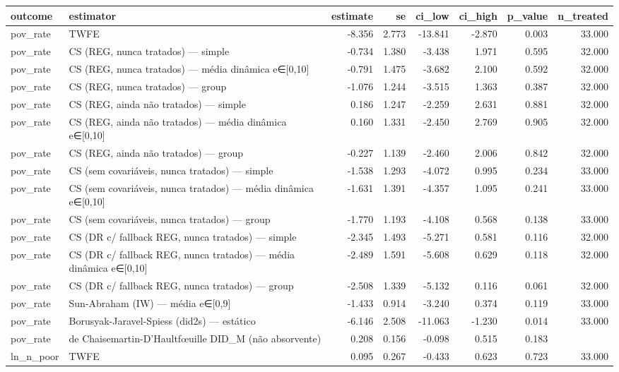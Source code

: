 \begin{tabular}{llrrrrrr}
\toprule
outcome & estimator & estimate & se & ci_low & ci_high & p_value & n_treated \\
\midrule
pov_rate & TWFE & -8.356 & 2.773 & -13.841 & -2.870 & 0.003 & 33.000 \\
pov_rate & CS (REG, nunca tratados) — simple & -0.734 & 1.380 & -3.438 & 1.971 & 0.595 & 32.000 \\
pov_rate & CS (REG, nunca tratados) — média dinâmica e∈[0,10] & -0.791 & 1.475 & -3.682 & 2.100 & 0.592 & 32.000 \\
pov_rate & CS (REG, nunca tratados) — group & -1.076 & 1.244 & -3.515 & 1.363 & 0.387 & 32.000 \\
pov_rate & CS (REG, ainda não tratados) — simple & 0.186 & 1.247 & -2.259 & 2.631 & 0.881 & 32.000 \\
pov_rate & CS (REG, ainda não tratados) — média dinâmica e∈[0,10] & 0.160 & 1.331 & -2.450 & 2.769 & 0.905 & 32.000 \\
pov_rate & CS (REG, ainda não tratados) — group & -0.227 & 1.139 & -2.460 & 2.006 & 0.842 & 32.000 \\
pov_rate & CS (sem covariáveis, nunca tratados) — simple & -1.538 & 1.293 & -4.072 & 0.995 & 0.234 & 33.000 \\
pov_rate & CS (sem covariáveis, nunca tratados) — média dinâmica e∈[0,10] & -1.631 & 1.391 & -4.357 & 1.095 & 0.241 & 33.000 \\
pov_rate & CS (sem covariáveis, nunca tratados) — group & -1.770 & 1.193 & -4.108 & 0.568 & 0.138 & 33.000 \\
pov_rate & CS (DR c/ fallback REG, nunca tratados) — simple & -2.345 & 1.493 & -5.271 & 0.581 & 0.116 & 32.000 \\
pov_rate & CS (DR c/ fallback REG, nunca tratados) — média dinâmica e∈[0,10] & -2.489 & 1.591 & -5.608 & 0.629 & 0.118 & 32.000 \\
pov_rate & CS (DR c/ fallback REG, nunca tratados) — group & -2.508 & 1.339 & -5.132 & 0.116 & 0.061 & 32.000 \\
pov_rate & Sun-Abraham (IW) — média e∈[0,9] & -1.433 & 0.914 & -3.240 & 0.374 & 0.119 & 33.000 \\
pov_rate & Borusyak-Jaravel-Spiess (did2s) — estático & -6.146 & 2.508 & -11.063 & -1.230 & 0.014 & 33.000 \\
pov_rate & de Chaisemartin-D'Haultfœuille DID_M (não absorvente) & 0.208 & 0.156 & -0.098 & 0.515 & 0.183 &  \\
ln_n_poor & TWFE & 0.095 & 0.267 & -0.433 & 0.623 & 0.723 & 33.000 \\

\end{tabular}
